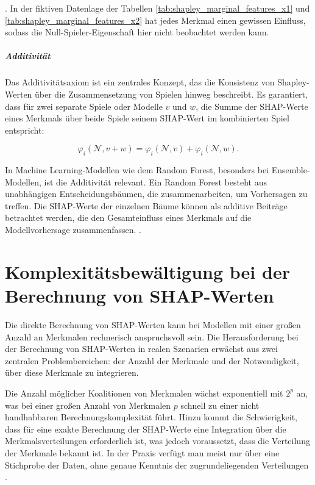 \cite[S. 222]{Molnar_2022}. In der fiktiven Datenlage der Tabellen \ref{tab:shapley_marginal_features_x1} und \ref{tab:shapley_marginal_features_x2} hat jedes Merkmal 
einen gewissen Einfluss, sodass die Null-Spieler-Eigenschaft hier nicht beobachtet werden kann.

\paragraph{Additivität}

Das Additivitätsaxiom ist ein zentrales Konzept, das die Konsistenz von Shapley-Werten 
über die Zusammensetzung von Spielen hinweg beschreibt. Es garantiert, 
dass für zwei separate Spiele oder Modelle \(v\) und \(w\), die Summe der SHAP-Werte eines 
Merkmals über beide Spiele seinem SHAP-Wert im kombinierten Spiel entspricht:

\begin{equation}
    \varphi_i(\mathcal{N}, v + w) = \varphi_i (\mathcal{N}, v) + \varphi_i (\mathcal{N}, w).
\end{equation}

In Machine Learning-Modellen wie dem Random Forest, besonders bei Ensemble-Modellen, 
ist die Additivität relevant. Ein Random Forest besteht aus unabhängigen Entscheidungsbäumen, 
die zusammenarbeiten, um Vorhersagen zu treffen. Die SHAP-Werte der einzelnen Bäume 
können als additive Beiträge betrachtet werden, die den Gesamteinfluss eines Merkmals 
auf die Modellvorhersage zusammenfassen. \cite[S. 32]{Molnar_2023}.

\chapter{Komplexitätsbewältigung bei der Berechnung von SHAP-Werten}
\label{sec:estimators}

Die direkte Berechnung von SHAP-Werten kann bei Modellen mit einer 
großen Anzahl an Merkmalen rechnerisch anspruchsvoll sein. Die Herausforderung bei der Berechnung von SHAP-Werten in realen Szenarien erwächst aus 
zwei zentralen Problembereichen: der Anzahl der Merkmale und der Notwendigkeit, 
über diese Merkmale zu integrieren. 

Die Anzahl möglicher Koalitionen von Merkmalen wächst exponentiell mit \( 2^p \) an, 
was bei einer großen Anzahl von Merkmalen \( p \) schnell zu einer nicht handhabbaren Berechnungskomplexität führt. 
Hinzu kommt die Schwierigkeit, dass für eine exakte Berechnung der SHAP-Werte eine Integration 
über die Merkmalsverteilungen erforderlich ist, was jedoch voraussetzt, dass die Verteilung der Merkmale bekannt ist. 
In der Praxis verfügt man meist nur über eine Stichprobe der Daten, ohne genaue Kenntnis der zugrundeliegenden Verteilungen \cite[S. 33]{Molnar_2023}.


